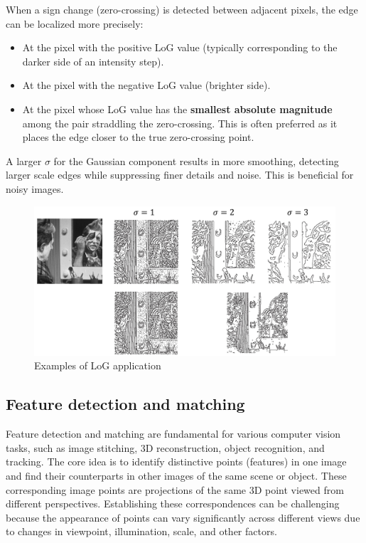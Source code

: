 When a sign change (zero-crossing) is detected between adjacent pixels, the edge can be localized more precisely:
\begin{itemize}
  \item At the pixel with the positive LoG value (typically corresponding to the darker side of an intensity step).
  \item At the pixel with the negative LoG value (brighter side).
  \item At the pixel whose LoG value has the \textbf{smallest absolute magnitude} among the pair straddling the zero-crossing. This is often preferred as it places the edge closer to the true zero-crossing point.
\end{itemize}
A larger $\sigma$ for the Gaussian component results in more smoothing, detecting larger scale edges while suppressing finer details and noise. This is beneficial for noisy images.

\begin{figure}[htbp]
  \centering
  \includegraphics[width=0.7\linewidth]{./img/log_application.jpg}
  \caption{Examples of LoG application}
  \label{fig:log_application}
\end{figure}

\subsection{Feature detection and matching}
Feature detection and matching are fundamental for various computer vision tasks, such as image stitching, 3D reconstruction, object recognition, and tracking. The core idea is to identify distinctive points (features) in one image and find their counterparts in other images of the same scene or object.
These corresponding image points are projections of the same 3D point viewed from different perspectives. Establishing these correspondences can be challenging because the appearance of points can vary significantly across different views due to changes in viewpoint, illumination, scale, and other factors.

